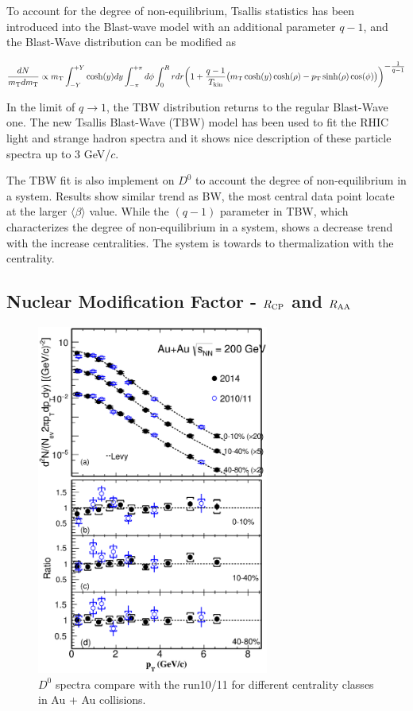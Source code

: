 To account for the degree of non-equilibrium, Tsallis statistics has been introduced into the Blast-wave model with an additional parameter $q-1$, and the Blast-Wave distribution can be modified as

\begin{equation}
\frac{dN}{m_{\rm T}dm_{\rm T}} \propto m_{\rm T}\int_{-Y}^{+Y}\cosh(y)dy \int_{-\pi}^{+\pi} d\phi \int_0^R rdr \bigg(1+\frac{q-1}{T_{\rm kin}}\big(m_{\rm T}\cosh(y)\cosh(\rho)-p_{\rm T}\sinh(\rho)\cos(\phi)\big)\bigg)^{\textstyle -\frac{1}{q-1}}
\end{equation}

In the limit of $q\rightarrow 1$, the TBW distribution returns to the regular Blast-Wave one. The new Tsallis Blast-Wave (TBW) model has been used to fit the RHIC light and strange hadron spectra and it shows nice description of these particle spectra up to 3 GeV/$c$.

The TBW fit is also implement on $D^0$ to account the degree of non-equilibrium in a system. Results show similar trend as BW, the most central data point locate at the larger $\langle\beta\rangle$ value. While the $(q-1)$ parameter in TBW, which characterizes the degree of non-equilibrium in a system, shows a decrease trend with the increase centralities. The system is towards to thermalization with the centrality.


\subsection{\label{result:RCP}Nuclear Modification Factor - $R_{\rm CP}$ and  $R_{\rm AA}$}

\begin{figure}
\centering
\includegraphics[width=0.68\textwidth]{figure/Run14_D0HFT/D0_compareSpectra_run10.eps}
\caption{$D^{0}$ spectra compare with the run10/11 for different centrality classes in Au + Au collisions.}
\label{D0_compareSpectra_run10} 
\end{figure}

